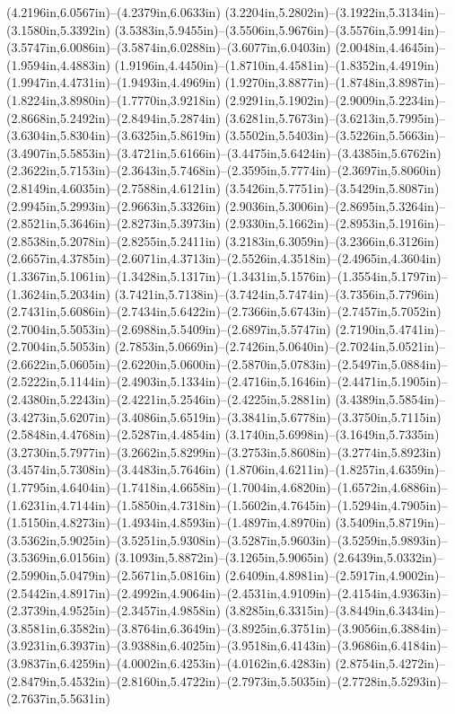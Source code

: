 (4.2196in,6.0567in)--(4.2379in,6.0633in) (3.2204in,5.2802in)--(3.1922in,5.3134in)--(3.1580in,5.3392in) (3.5383in,5.9455in)--(3.5506in,5.9676in)--(3.5576in,5.9914in)--(3.5747in,6.0086in)--(3.5874in,6.0288in)--(3.6077in,6.0403in) (2.0048in,4.4645in)--(1.9594in,4.4883in) (1.9196in,4.4450in)--(1.8710in,4.4581in)--(1.8352in,4.4919in) (1.9947in,4.4731in)--(1.9493in,4.4969in) (1.9270in,3.8877in)--(1.8748in,3.8987in)--(1.8224in,3.8980in)--(1.7770in,3.9218in) (2.9291in,5.1902in)--(2.9009in,5.2234in)--(2.8668in,5.2492in)--(2.8494in,5.2874in) (3.6281in,5.7673in)--(3.6213in,5.7995in)--(3.6304in,5.8304in)--(3.6325in,5.8619in) (3.5502in,5.5403in)--(3.5226in,5.5663in)--(3.4907in,5.5853in)--(3.4721in,5.6166in)--(3.4475in,5.6424in)--(3.4385in,5.6762in) (2.3622in,5.7153in)--(2.3643in,5.7468in)--(2.3595in,5.7774in)--(2.3697in,5.8060in) (2.8149in,4.6035in)--(2.7588in,4.6121in) (3.5426in,5.7751in)--(3.5429in,5.8087in) (2.9945in,5.2993in)--(2.9663in,5.3326in) (2.9036in,5.3006in)--(2.8695in,5.3264in)--(2.8521in,5.3646in)--(2.8273in,5.3973in) (2.9330in,5.1662in)--(2.8953in,5.1916in)--(2.8538in,5.2078in)--(2.8255in,5.2411in) (3.2183in,6.3059in)--(3.2366in,6.3126in) (2.6657in,4.3785in)--(2.6071in,4.3713in)--(2.5526in,4.3518in)--(2.4965in,4.3604in) (1.3367in,5.1061in)--(1.3428in,5.1317in)--(1.3431in,5.1576in)--(1.3554in,5.1797in)--(1.3624in,5.2034in) (3.7421in,5.7138in)--(3.7424in,5.7474in)--(3.7356in,5.7796in) (2.7431in,5.6086in)--(2.7434in,5.6422in)--(2.7366in,5.6743in)--(2.7457in,5.7052in) (2.7004in,5.5053in)--(2.6988in,5.5409in)--(2.6897in,5.5747in) (2.7190in,5.4741in)--(2.7004in,5.5053in) (2.7853in,5.0669in)--(2.7426in,5.0640in)--(2.7024in,5.0521in)--(2.6622in,5.0605in)--(2.6220in,5.0600in)--(2.5870in,5.0783in)--(2.5497in,5.0884in)--(2.5222in,5.1144in)--(2.4903in,5.1334in)--(2.4716in,5.1646in)--(2.4471in,5.1905in)--(2.4380in,5.2243in)--(2.4221in,5.2546in)--(2.4225in,5.2881in) (3.4389in,5.5854in)--(3.4273in,5.6207in)--(3.4086in,5.6519in)--(3.3841in,5.6778in)--(3.3750in,5.7115in) (2.5848in,4.4768in)--(2.5287in,4.4854in) (3.1740in,5.6998in)--(3.1649in,5.7335in) (3.2730in,5.7977in)--(3.2662in,5.8299in)--(3.2753in,5.8608in)--(3.2774in,5.8923in) (3.4574in,5.7308in)--(3.4483in,5.7646in) (1.8706in,4.6211in)--(1.8257in,4.6359in)--(1.7795in,4.6404in)--(1.7418in,4.6658in)--(1.7004in,4.6820in)--(1.6572in,4.6886in)--(1.6231in,4.7144in)--(1.5850in,4.7318in)--(1.5602in,4.7645in)--(1.5294in,4.7905in)--(1.5150in,4.8273in)--(1.4934in,4.8593in)--(1.4897in,4.8970in) (3.5409in,5.8719in)--(3.5362in,5.9025in)--(3.5251in,5.9308in)--(3.5287in,5.9603in)--(3.5259in,5.9893in)--(3.5369in,6.0156in) (3.1093in,5.8872in)--(3.1265in,5.9065in) (2.6439in,5.0332in)--(2.5990in,5.0479in)--(2.5671in,5.0816in) (2.6409in,4.8981in)--(2.5917in,4.9002in)--(2.5442in,4.8917in)--(2.4992in,4.9064in)--(2.4531in,4.9109in)--(2.4154in,4.9363in)--(2.3739in,4.9525in)--(2.3457in,4.9858in) (3.8285in,6.3315in)--(3.8449in,6.3434in)--(3.8581in,6.3582in)--(3.8764in,6.3649in)--(3.8925in,6.3751in)--(3.9056in,6.3884in)--(3.9231in,6.3937in)--(3.9388in,6.4025in)--(3.9518in,6.4143in)--(3.9686in,6.4184in)--(3.9837in,6.4259in)--(4.0002in,6.4253in)--(4.0162in,6.4283in) (2.8754in,5.4272in)--(2.8479in,5.4532in)--(2.8160in,5.4722in)--(2.7973in,5.5035in)--(2.7728in,5.5293in)--(2.7637in,5.5631in) 